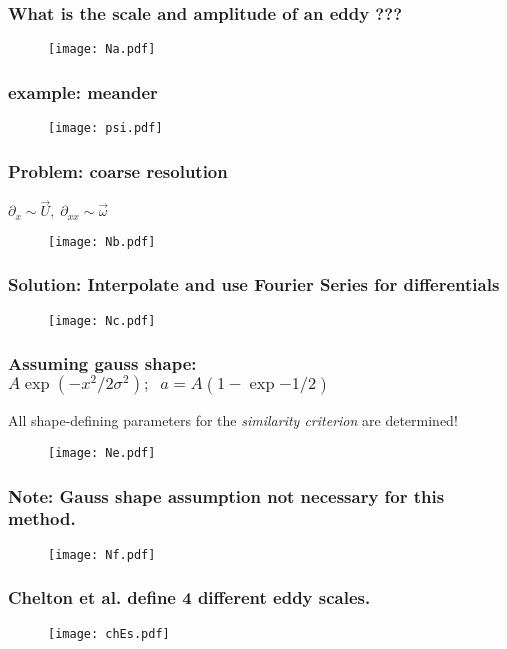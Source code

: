 \begin{frame}
\frametitle{What is the scale and amplitude of an eddy ???}
 \begin{figure}
\centering
\texttt{[image: Na.pdf]}
\end{figure}
\end{frame}


\begin{frame}
 \frametitle{example: meander}
\begin{figure}
\centering
	\texttt{[image: psi.pdf]}
\end{figure}
\end{frame}


\begin{frame}
\frametitle{Problem: coarse resolution}
$ \partial_x \sim \vec{U}, \; \partial_{xx} \sim \vec{\omega}$
 \begin{figure}
\centering
\texttt{[image: Nb.pdf]}
\end{figure}
\end{frame}


\begin{frame}
\frametitle{Solution: Interpolate and use Fourier Series for differentials}
 \begin{figure}
\centering
\texttt{[image: Nc.pdf]}
\end{figure}
\end{frame}

\begin{frame}
\frametitle{Assuming gauss shape:  $A \exp{\left(- x^2/2\sigma^2\right)}; \;\;a=A(1-\exp{-1/2})$}
All shape-defining parameters for the \textit{similarity criterion} are determined!  
 \begin{figure}
\centering
\texttt{[image: Ne.pdf]}
\end{figure}
\end{frame}


\begin{frame}
\frametitle{Note: Gauss shape assumption not necessary for this method.}
 \begin{figure}
\centering
\texttt{[image: Nf.pdf]}
\end{figure}
\end{frame}

\begin{frame}
\frametitle{Chelton et al. define 4 different eddy scales.}
 \begin{figure}
\centering
\texttt{[image: chEs.pdf]}
\end{figure}
\end{frame}

